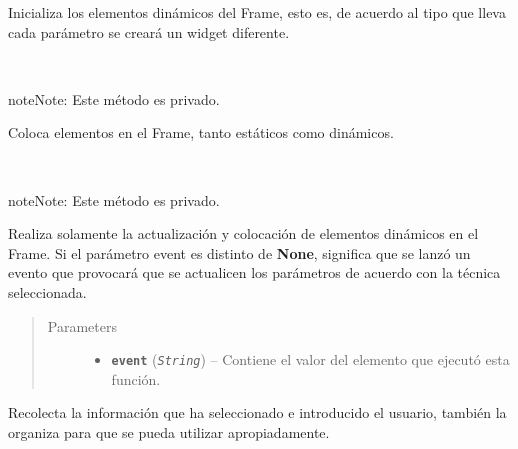 \documentclass[class=report, crop=false]{standalone}
\begin{document}
\begin{fulllineitems}
\begin{fulllineitems}
Inicializa los elementos dinámicos del Frame, esto es, de 
acuerdo al tipo que lleva cada parámetro se creará un widget 
diferente.

\end{fulllineitems}

\begin{fulllineitems}

~

\begin{notice}{note}{Note:}
Este método es privado.
\end{notice}

Coloca elementos en el Frame, tanto estáticos como 
dinámicos.

\end{fulllineitems}

\begin{fulllineitems}

~

\begin{notice}{note}{Note:}
Este método es privado.
\end{notice}

Realiza solamente la actualización y colocación de elementos 
dinámicos en el Frame.\break
Si el parámetro event es distinto de \textbf{None}, significa 
que se lanzó un evento que provocará que se actualicen los 
parámetros de acuerdo con la técnica seleccionada.

\begin{quote}\begin{description}
\item[{Parameters}] \leavevmode\begin{itemize}
\item \textbf{\texttt{event}} (\emph{\texttt{String}}) -- Contiene el valor del elemento que ejecutó esta función.
\end{itemize}
\end{description}\end{quote}

\end{fulllineitems}

\begin{fulllineitems}

Recolecta la información que ha seleccionado e introducido 
el usuario, también la organiza para que se pueda utilizar 
apropiadamente.


\end{fulllineitems}
\end{fulllineitems}
\end{document}
